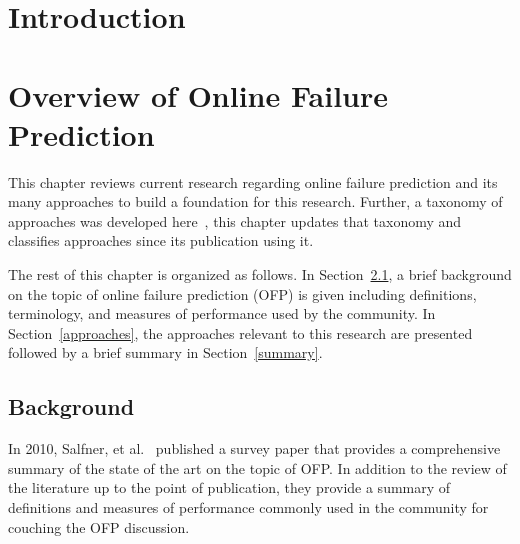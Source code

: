 \documentclass[12pt,letterpaper,oneside]{book}
\begin{document}
\frontmatter
	\flyleaf                        
	\disclaimerpage                 
	\titlepageAFIT                      
	\committeepage  
	
	
	\tableofcontents
	\listoffigures
	\listoftables
\mainmatter

\chapter{Introduction}


\chapter{Overview of Online Failure Prediction} \label{chapter2}
This chapter reviews current research regarding online failure prediction and
its many approaches to build a foundation for this research.  Further, a
taxonomy of approaches was developed here~\cite{salfnerSurvey}, this chapter
updates that taxonomy and classifies approaches since its publication using it.

The rest of this chapter is organized as follows.  In Section~\ref{background},
a brief background on the topic of online failure prediction (OFP) is given
including definitions, terminology, and measures of performance used by the
community.  In Section~\ref{approaches}, the approaches relevant to this
research are presented followed by a brief summary in Section~\ref{summary}.

\section{Background} \label{background}
In 2010, Salfner, et al.~\cite{salfnerSurvey} published a survey paper that
provides a comprehensive summary of the state of the art on the topic of OFP.
In addition to the review of the literature up to the point of publication,
they provide a summary of definitions and measures of performance commonly used
in the community for couching the OFP discussion.
\end{document}
